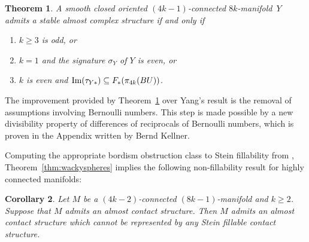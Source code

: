 \documentclass[12pt]{amsart}
\newcommand\im{\textup{Im}}
\newcommand\Num{\textup{Num}}
\newtheorem{Theorem}{Theorem}[section]
\newtheorem{Corollary}[Theorem]{Corollary}
\theoremstyle{remark}
\begin{document}
\begin{Theorem} \label{thm:YangIntro}
A smooth closed oriented $(4k{-}1)$-connected $8k$-manifold\,\,\,$Y$\! admits
a stable almost complex structure if and only if
\begin{enumerate}
\item $k\geq 3$ is odd, or
\item  $k=1$ and the  signature $\sigma_Y$ of $Y$  is even, or
\item $k$ is even and  $\im(\tau_{Y*}) \subseteq F_*(\pi_{4k}(BU))$.
\end{enumerate}
%
\end{Theorem}
The improvement provided by Theorem~\ref{thm:YangIntro} over
Yang's result 
is the removal of assumptions involving Bernoulli numbers.
This step is made possible by a new divisibility property
of differences of reciprocals of Bernoulli numbers, which is proven in the Appendix
written by Bernd Kellner.


Computing the appropriate bordism obstruction class to Stein fillability from \cite{BCS2},
Theorem~\ref{thm:wackyspheres} implies the following non{-}fillability result for highly
connected manifolds:


\begin{Corollary}\label{cor:wacky}
Let $M$ be a $(4k{-}2)$-connected $(8k{-}1)$-manifold and $k \geq 2$.
Suppose that $M$ admits an almost contact structure.
Then $M$ admits an almost contact structure which cannot be
represented by any Stein fillable contact structure.
\end{Corollary}
\end{document}
